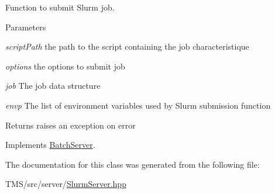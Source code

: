 Function to submit Slurm job. 


\begin{DoxyParams}{Parameters}
\item[{\em scriptPath}]the path to the script containing the job characteristique \item[{\em options}]the options to submit job \item[{\em job}]The job data structure \item[{\em envp}]The list of environment variables used by Slurm submission function \end{DoxyParams}
\begin{DoxyReturn}{Returns}
raises an exception on error 
\end{DoxyReturn}


Implements \hyperlink{classBatchServer_a078c0f8605e770c02b8eca0351526f59}{BatchServer}.



The documentation for this class was generated from the following file:\begin{DoxyCompactItemize}
\item 
TMS/src/server/\hyperlink{SlurmServer_8hpp}{SlurmServer.hpp}\end{DoxyCompactItemize}
